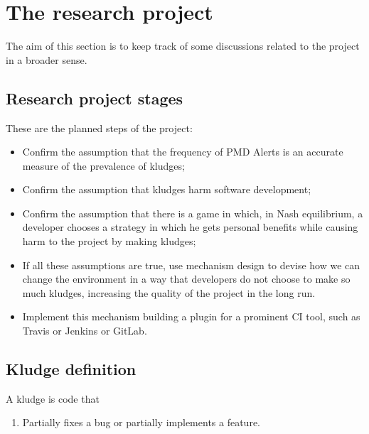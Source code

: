 \documentclass[
]{article}
\providecommand{\tightlist}{%
  \setlength{\itemsep}{0pt}\setlength{\parskip}{0pt}}
\begin{document}
%
%

\section{The research project}
\label{as_whole}

The aim of this section is to keep track of some discussions related to
the project in a broader sense.

\subsection{Research project stages}
\label{research-stages}

These are the planned steps of the
project:

\begin{itemize}
\item
  Confirm the assumption that the frequency of PMD Alerts is an accurate
  measure of the prevalence of kludges;
  
\item
  Confirm the assumption that kludges harm software development;
  
\item
  Confirm the assumption that there is a game in which, in Nash
  equilibrium, a developer chooses a strategy in which he gets personal
  benefits while causing harm to the project by making kludges;
  
\item
  If all these assumptions are true, use mechanism design to devise how
  we can change the environment in a way that developers do not choose
  to make so much kludges, increasing the quality of the project in the
  long run.
  
\item
  Implement this mechanism building a plugin for a prominent CI tool,
  such as Travis or Jenkins or GitLab.
  
\end{itemize}

\subsection{Kludge definition}
\label{kludge definition}

A kludge is code that

\begin{enumerate}
\def\labelenumi{\arabic{enumi}.}
\tightlist
\item
  Partially fixes a bug or partially implements a feature.
\end{enumerate}
\end{document}
